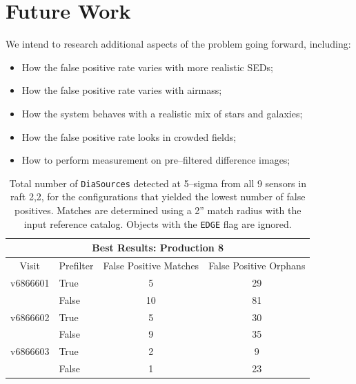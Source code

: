 \documentclass[prd, nofootinbib, floatfix, 11pt,tightenlines,times]{article}
\begin{document}
\section{Future Work}

We intend to research additional aspects of the problem going forward,
including:
\begin{itemize}
\item How the false positive rate varies with more realistic SEDs;
\item How the false positive rate varies with airmass;
\item How the system behaves with a realistic mix of stars and galaxies;
\item How the false positive rate looks in crowded fields;
\item How to perform measurement on pre--filtered difference images;
\end{itemize}

\clearpage



\clearpage
\begin{table}
\centering
\begin{tabular}{clcc}
\hline
\multicolumn{4}{|c|}{Best Results: Production 8} \\
\hline
Visit    & Prefilter & False Positive Matches & False Positive Orphans \\
\hline
v6866601 & True      & 5                      & 29  \\
         & False     & 10                     & 81  \\
v6866602 & True      & 5                      & 30  \\
         & False     & 9                      & 35  \\
v6866603 & True      & 2                      & 9   \\
         & False     & 1                      & 23  \\
\end{tabular}
\caption{Total number of {\tt DiaSources} detected at 5--sigma from
  all 9 sensors in raft 2,2, for the configurations that yielded the
  lowest number of false positives.  Matches are determined using a
  2'' match radius with the input reference catalog.  Objects with the
  {\tt EDGE} flag are ignored. \label{tab-bestfp8}}
\end{table}
\end{document}
